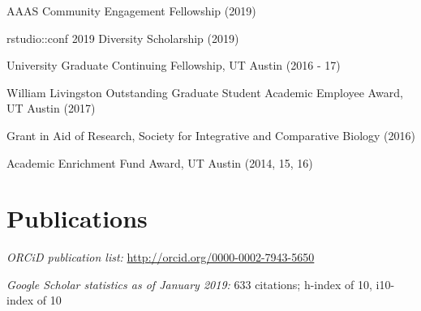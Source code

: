 \documentclass[margin,line]{CV}
\begin{document}
\begin{resume}
\begin{description}[leftmargin=0pt]  
\setlength{\itemsep}{1pt} 
\item[] AAAS Community Engagement Fellowship (2019)
\item[] rstudio::conf 2019 Diversity Scholarship (2019)
\item[] University Graduate Continuing Fellowship, UT Austin (2016 - 17)
\item[] William Livingston Outstanding Graduate Student Academic Employee Award, UT Austin (2017)
\item[] Grant in Aid of Research,  Society for Integrative and Comparative Biology (2016)
\item[] Academic Enrichment Fund Award, UT Austin (2014, 15, 16)
\end{description}




\section{\mysidestyle Publications}
    
\begin{description}[leftmargin=0pt]  
\setlength{\itemsep}{2pt} 
\item[] {\em ORCiD publication list:} \url{http://orcid.org/0000-0002-7943-5650}
\item[] {\em Google Scholar statistics as of January 2019:} 633 citations; h-index of 10, i10-index of 10
\end{description}


\end{resume}
\end{document}
